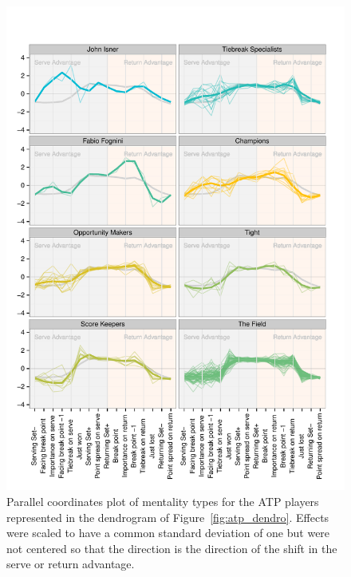 \documentclass{Latex/svjour3}
\begin{document}
\begin{figure}
\includegraphics[scale=0.9]{figs/atp_coords_std_fixed.pdf}
\caption{Parallel coordinates plot of mentality types for the ATP players
  represented in the dendrogram of Figure~\ref{fig:atp_dendro}. Effects were
  scaled to have a common standard deviation of one but were not centered so
  that the direction is the direction of the shift in the serve or return
  advantage.}
\label{fig:atp_coord}
\end{figure}

\clearpage
\end{document}
